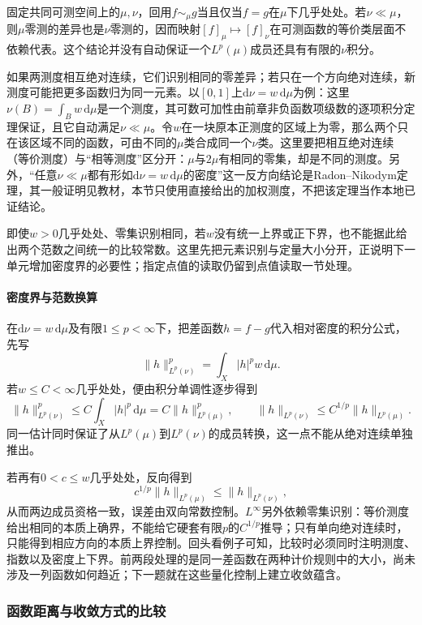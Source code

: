 固定共同可测空间上的$\mu,\nu$，回用$f\sim_\mu g$当且仅当$f=g$在$\mu$下几乎处处。若$\nu\ll\mu$，则$\mu$零测的差异也是$\nu$零测的，因而映射$[f]_\mu\mapsto[f]_\nu$在可测函数的等价类层面不依赖代表。这个结论并没有自动保证一个$L^p(\mu)$成员还具有有限的$\nu$积分。

如果两测度相互绝对连续，它们识别相同的零差异；若只在一个方向绝对连续，新测度可能把更多函数归为同一元素。以$[0,1]$上$\mathrm d\nu=w\,\mathrm d\mu$为例：这里$\nu(B)=\int_Bw\,\mathrm d\mu$是一个测度，其可数可加性由前章非负函数项级数的逐项积分定理保证，且它自动满足$\nu\ll\mu$。令$w$在一块原本正测度的区域上为零，那么两个只在该区域不同的函数，可由不同的$\mu$类合成同一个$\nu$类。这里要把相互绝对连续（等价测度）与“相等测度”区分开：$\mu$与$2\mu$有相同的零集，却是不同的测度。另外，“任意$\nu\ll\mu$都有形如$\mathrm d\nu=w\,\mathrm d\mu$的密度”这一反方向结论是Radon--Nikodym定理，其一般证明见教材，本节只使用直接给出的加权测度，不把该定理当作本地已证结论。

即使$w>0$几乎处处、零集识别相同，若$w$没有统一上界或正下界，也不能据此给出两个范数之间统一的比较常数。这里先把元素识别与定量大小分开，正说明下一单元增加密度界的必要性；指定点值的读取仍留到点值读取一节处理。

\paragraph{密度界与范数换算}

在$\mathrm d\nu=w\,\mathrm d\mu$及有限$1\le p<\infty$下，把差函数$h=f-g$代入相对密度的积分公式，先写
\[
  \|h\|_{L^p(\nu)}^p=\int_X|h|^pw\,\mathrm d\mu.
\]
若$w\le C<\infty$几乎处处，便由积分单调性逐步得到
\[
  \|h\|_{L^p(\nu)}^p\le C\int_X|h|^p\,\mathrm d\mu=C\|h\|_{L^p(\mu)}^p,
\qquad
  \|h\|_{L^p(\nu)}\le C^{1/p}\|h\|_{L^p(\mu)}.
\]
同一估计同时保证了从$L^p(\mu)$到$L^p(\nu)$的成员转换，这一点不能从绝对连续单独推出。

若再有$0<c\le w$几乎处处，反向得到
\[
  c^{1/p}\|h\|_{L^p(\mu)}\le\|h\|_{L^p(\nu)},
\]
从而两边成员资格一致，误差由双向常数控制。$L^\infty$另外依赖零集识别：等价测度给出相同的本质上确界，不能给它硬套有限$p$的$C^{1/p}$推导；只有单向绝对连续时，只能得到相应方向的本质上界控制。回头看例子可知，比较时必须同时注明测度、指数以及密度上下界。前两段处理的是同一差函数在两种计价规则中的大小，尚未涉及一列函数如何趋近；下一题就在这些量化控制上建立收敛蕴含。

\subsubsection{函数距离与收敛方式的比较}
\label{subsubsec:convergence-comparison}

